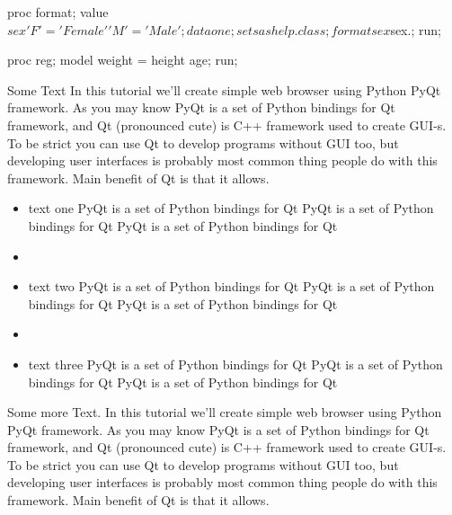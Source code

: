 \documentclass[a4paper]{article}
\begin{document}
\begin{Datastep}
proc format;
   value $sex 'F' = 'Female' 'M' = 'Male';
data one;
   set sashelp.class;
   format sex $sex.;
run;
\end{Datastep}

\begin{Sascode}[store=class]
proc reg;
    model weight = height age;
run;
\end{Sascode}






Some Text
In this tutorial we'll create simple web browser using Python PyQt
framework. As you may know PyQt is a set of Python bindings for Qt
framework, and Qt (pronounced cute) is C++ framework used to create
GUI-s. To be strict you can use Qt to develop programs without GUI
too, but developing user interfaces is probably most common thing
people do with this framework. Main benefit of Qt is that it allows.

\begin{itemize}
  \item text one PyQt is a set of Python bindings for Qt
  PyQt is a set of Python bindings for Qt
  PyQt is a set of Python bindings for Qt
  \item
  \item text two PyQt is a set of Python bindings for Qt
  PyQt is a set of Python bindings for Qt
  PyQt is a set of Python bindings for Qt
  \item
  \item text three PyQt is a set of Python bindings for Qt
  PyQt is a set of Python bindings for Qt
  PyQt is a set of Python bindings for Qt
\end{itemize}

Some more Text.
In this tutorial we'll create simple web browser using Python PyQt
framework. As you may know PyQt is a set of Python bindings for Qt
framework, and Qt (pronounced cute) is C++ framework used to create
GUI-s. To be strict you can use Qt to develop programs without GUI
too, but developing user interfaces is probably most common thing
people do with this framework. Main benefit of Qt is that it allows.
\end{document}
